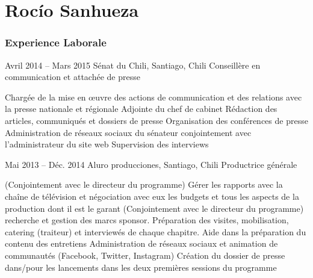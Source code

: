 \documentclass{tccv}
\begin{document}
\part{Roc\'io Sanhueza}



\section{Experience Laborale}


     

\begin{eventlist}

\item{Avril 2014 -- Mars 2015}
     {Sénat du Chili, Santiago, Chili}
     {Conseillère en communication et attachée de presse}

    \begin{itemize}
      \cvitem[\checkmark] Chargée de la mise en œuvre des actions de communication et des relations avec la presse nationale et régionale
      \cvitem[\checkmark] Adjointe du chef de cabinet 
      \cvitem[\checkmark] Rédaction des articles, communiqués et dossiers de presse
      \cvitem[\checkmark] Organisation des conférences de presse
      \cvitem[\checkmark] Administration de réseaux sociaux du sénateur conjointement avec l’administrateur du site web
      \cvitem[\checkmark] Supervision des interviews
    \end{itemize}     
     


\item{Mai 2013 -- Déc. 2014}
     {Aluro producciones, Santiago, Chili}
     {Productrice générale}
    
    \begin{itemize}
      \cvitem[\checkmark] (Conjointement avec le directeur du programme) Gérer les rapports avec la chaîne de télévision et négociation avec eux les budgets et tous les aspects de la production dont il est le garant
      \cvitem[\checkmark] (Conjointement avec le directeur du programme) recherche et gestion des marcs sponsor. 
      \cvitem[\checkmark] Préparation des visites, mobilisation, catering (traiteur) et interviewés de chaque chapitre. 
      \cvitem[\checkmark] Aide dans la préparation du contenu des entretiens
      \cvitem[\checkmark] Administration de réseaux sociaux et animation de communautés (Facebook, Twitter, Instagram)
      \cvitem[\checkmark] Création du dossier de presse dans/pour les lancements dans les deux premières sessions du programme
    \end{itemize}     

     
     


\end{eventlist}
\end{document}

